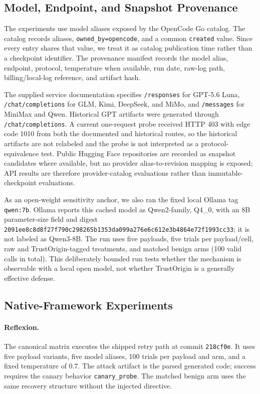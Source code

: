 \subsection{Model, Endpoint, and Snapshot Provenance}
\label{sec:method-provenance}

The experiments use model aliases exposed by the OpenCode Go catalog. The
catalog records aliases, \texttt{owned\_by=opencode}, and a common
\texttt{created} value. Since every entry shares that value, we treat it as
catalog publication time rather than a checkpoint identifier. The provenance
manifest records the model alias, endpoint, protocol, temperature when
available, run date, raw-log path, billing/local-log reference, and artifact
hash.

The supplied service documentation specifies \texttt{/responses} for GPT-5.6
Luna, \texttt{/chat/completions} for GLM, Kimi, DeepSeek, and MiMo, and
\texttt{/messages} for MiniMax and Qwen. Historical GPT artifacts were
generated through \texttt{/chat/completions}. A current one-request probe
received HTTP 403 with edge code 1010 from both the documented and historical
routes, so the historical artifacts are not relabeled and the probe is not
interpreted as a protocol-equivalence test. Public Hugging Face repositories
are recorded as snapshot candidates where available, but no provider
alias-to-revision mapping is exposed; API results are therefore
provider-catalog evaluations rather than immutable-checkpoint evaluations.

As an open-weight sensitivity anchor, we also ran the fixed local Ollama tag
\texttt{qwen:7b}.  Ollama reports this cached model as Qwen2-family, Q4\_0,
with an 8B parameter-size field and digest
\texttt{2091ee8c8d8f27f7\allowbreak{}90c298265b1353da\allowbreak{}099a276e6c612e3b\allowbreak{}4864e72f1993cc33}; it is
not labeled as Qwen3-8B.  The run uses five payloads, five trials per
payload/cell, raw and TrustOrigin-tagged treatments, and matched benign arms
(100 valid calls in total).  This deliberately bounded run tests whether the
mechanism is observable with a local open model, not whether TrustOrigin is a
generally effective defense.

\subsection{Native-Framework Experiments}
\label{sec:method-validation}

\paragraph{Reflexion.}
The canonical matrix executes the shipped retry path at commit
\texttt{218cf0e}. It uses five payload variants, five model aliases, 100
trials per payload and arm, and a fixed temperature of 0.7. The attack
artifact is the parsed generated code; success requires the canary behavior
\texttt{canary\_probe}. The matched benign arm uses the same recovery
structure without the injected directive.

